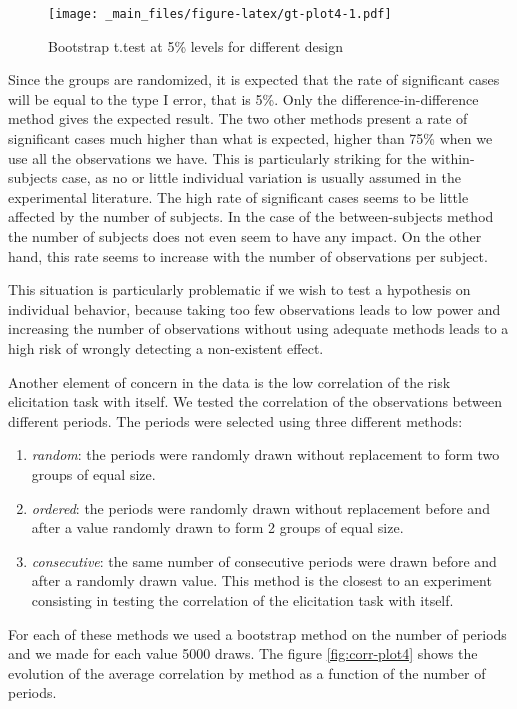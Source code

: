 \documentclass[
]{book}
\providecommand{\tightlist}{%
  \setlength{\itemsep}{0pt}\setlength{\parskip}{0pt}}
\begin{document}
\begin{figure}
\centering
\texttt{[image: \_main\_files/figure-latex/gt-plot4-1.pdf]}
\caption{\label{fig:gt-plot4}Bootstrap t.test at 5\% levels for different design}
\end{figure}

Since the groups are randomized, it is expected that the rate of
significant cases will be equal to the type I error, that is 5\%.
Only the difference-in-difference method gives the expected
result.
The two other methods present a rate of significant cases much
higher than what is expected, higher than 75\% when we use all the
observations we have.
This is particularly striking for the within-subjects case, as no or little
individual variation is usually assumed in the experimental literature.
The high rate of significant cases seems to be little
affected by the number of subjects. In the case of the between-subjects method
the number of subjects does not even seem to have any impact. On the
other hand, this rate seems to increase with the number of observations
per subject.

This situation is particularly problematic if we wish to
test a hypothesis on individual behavior, because taking too few
observations leads to low power and increasing the number of
observations without using adequate methods leads to a high risk of
wrongly detecting a non-existent effect.

Another element of concern in the data is the low correlation of the risk elicitation task with
itself.
We tested the correlation of the observations between different periods.
The periods were selected using three different methods:

\begin{enumerate}
\def\labelenumi{\arabic{enumi}.}
\tightlist
\item
  \emph{random}: the periods were randomly drawn without replacement to form
  two groups of equal size.
\item
  \emph{ordered}: the periods were randomly drawn without replacement
  before and after a value randomly drawn to form 2 groups of equal
  size.
\item
  \emph{consecutive}: the same number of consecutive periods were drawn before and
  after a randomly drawn value. This method is the closest to an
  experiment consisting in testing the correlation of the elicitation
  task with itself.
\end{enumerate}

For each of these methods we used a bootstrap method on the number of
periods and we made for each value 5000 draws. The figure \ref{fig:corr-plot4}
shows the evolution of the average correlation by method as a function of the
number of periods.
\end{document}
